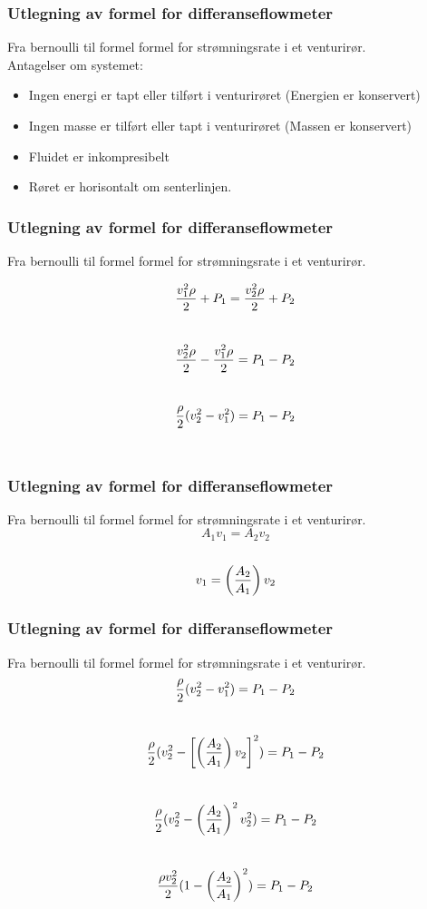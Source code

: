 \documentclass[aspectratio=169,xcolor=dvipsnames]{beamer}
\begin{document}
\begin{frame}
	\frametitle{Utlegning av formel for differanseflowmeter}
	Fra bernoulli til formel formel for strømningsrate i et venturirør. 
	\\
	Antagelser om systemet:
\begin{itemize}

	\item Ingen energi er tapt eller tilført i venturirøret (Energien er konservert)
	\item Ingen masse er tilført eller tapt i venturirøret (Massen er konservert)
	\item Fluidet er inkompresibelt
	\item Røret er horisontalt om senterlinjen. 
\end{itemize}

\end{frame}

\begin{frame}
	\frametitle{Utlegning av formel for differanseflowmeter}
	Fra bernoulli til formel formel for strømningsrate i et venturirør. 

$${v_1^2 \rho \over 2} + P_1 = {v_2^2 \rho \over 2} + P_2$$
\\
$${v_2^2 \rho \over 2} - {v_1^2 \rho \over 2} = P_1 - P_2$$
\\
$${\rho \over 2} (v_2^2 - v_1^2) = P_1 - P_2$$
\\
\end{frame}

\begin{frame}
	\frametitle{Utlegning av formel for differanseflowmeter}
	Fra bernoulli til formel formel for strømningsrate i et venturirør. 
$$A_1 v_1 = A_2 v_2$$
\\
$$v_1 = \left({A_2 \over A_1}\right) v_2$$
\end{frame}

\begin{frame}
	\frametitle{Utlegning av formel for differanseflowmeter}
	Fra bernoulli til formel formel for strømningsrate i et venturirør. 
%
%
%
%
$${\rho \over 2} (v_2^2 - v_1^2) = P_1 - P_2$$
\\
$${\rho \over 2} (v_2^2 - \left[\left({A_2 \over A_1}\right) v_2\right]^2) = P_1 - P_2$$
\\
$${\rho \over 2} (v_2^2 - \left({A_2 \over A_1}\right)^2 v_2^2) = P_1 - P_2$$
\\
$${\rho v_2^2 \over 2} (1 - \left({A_2 \over A_1}\right)^2) = P_1 - P_2$$
\end{frame}
\end{document}
